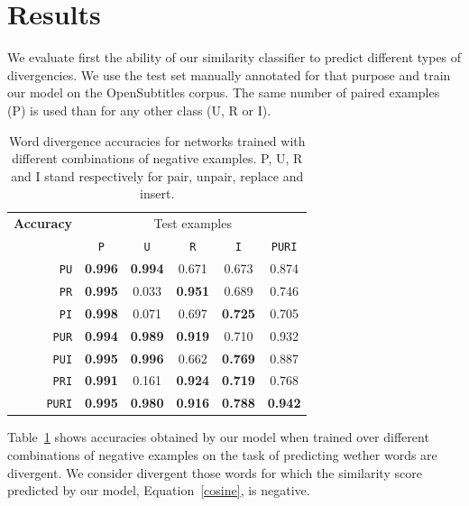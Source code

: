 \documentclass[11pt,a4paper]{article}
\begin{document}
\section{Results}
\label{sec:results}

We evaluate first the ability of our similarity classifier to predict different types of divergencies. 
We use the test set manually annotated for that purpose and train our model on the OpenSubtitles corpus.
The same number of paired examples (P) is used than for any other class (U, R or I). %

\begin{table}[h]
\small
\center
\begin{tabular}{crccccc}
\hline
\multicolumn{2}{l}{\bf Accuracy} & \multicolumn{5}{c}{Test examples} \\
 &  & \texttt{P} & \texttt{U} & \texttt{R} & \texttt{I} & \texttt{PURI} \\
 \hline
\parbox[t]{0mm}{} &  \texttt{PU}     & \bf 0.996 & \bf 0.994 & 0.671 & 0.673 & 0.874 \\
 &  \texttt{PR}     & \bf 0.995 &      0.033 & \bf 0.951 &      0.689 & 0.746 \\
 &  \texttt{PI}       & \bf 0.998 &      0.071 &      0.697 & \bf 0.725 & 0.705 \\
 &  \texttt{PUR}  & \bf 0.994 & \bf 0.989 & \bf 0.919 &      0.710 & 0.932 \\
 &  \texttt{PUI}    & \bf 0.995 & \bf 0.996 &      0.662 & \bf 0.769 & 0.887 \\
 &  \texttt{PRI}    & \bf 0.991 &      0.161 & \bf 0.924 & \bf 0.719 & 0.768 \\
 &  \texttt{PURI} & \bf 0.995 & \bf 0.980 & \bf 0.916 & \bf 0.788 & \bf 0.942 \\
\hline
\end{tabular}
\caption{Word divergence accuracies for networks trained with different combinations of negative examples. P, U, R and I stand respectively for pair, unpair, replace and insert.}
\label{results_puri}
\end{table}

Table~\ref{results_puri} shows accuracies obtained by our model when trained over different combinations of negative examples on the task of predicting wether words are divergent. 
We consider divergent those words for which the similarity score predicted by our model, Equation~\ref{cosine}, is negative.
\end{document}
